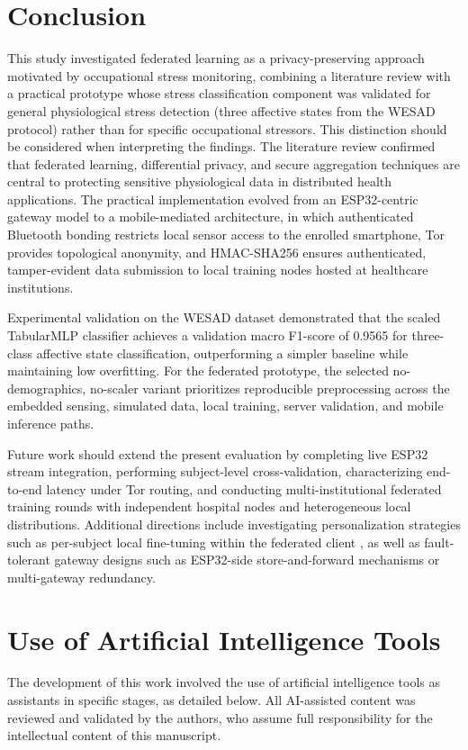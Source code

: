 \documentclass[12pt]{article}
\begin{document}
\section{Conclusion}

This study investigated federated learning as a privacy-preserving approach motivated by occupational stress monitoring, combining a literature review with a practical prototype whose stress classification component was validated for general physiological stress detection (three affective states from the WESAD protocol) rather than for specific occupational stressors. This distinction should be considered when interpreting the findings. The literature review confirmed that federated learning, differential privacy, and secure aggregation techniques are central to protecting sensitive physiological data in distributed health applications. The practical implementation evolved from an ESP32-centric gateway model to a mobile-mediated architecture, in which authenticated Bluetooth bonding restricts local sensor access to the enrolled smartphone, Tor provides topological anonymity, and HMAC-SHA256 ensures authenticated, tamper-evident data submission to local training nodes hosted at healthcare institutions.

Experimental validation on the WESAD dataset demonstrated that the scaled TabularMLP classifier achieves a validation macro F1-score of 0.9565 for three-class affective state classification, outperforming a simpler baseline while maintaining low overfitting. For the federated prototype, the selected no-demographics, no-scaler variant prioritizes reproducible preprocessing across the embedded sensing, simulated data, local training, server validation, and mobile inference paths.

Future work should extend the present evaluation by completing live ESP32 stream integration, performing subject-level cross-validation, characterizing end-to-end latency under Tor routing, and conducting multi-institutional federated training rounds with independent hospital nodes and heterogeneous local distributions. Additional directions include investigating personalization strategies such as per-subject local fine-tuning within the federated client \cite{ereno2025avaliando}, as well as fault-tolerant gateway designs such as ESP32-side store-and-forward mechanisms or multi-gateway redundancy.

\section*{Use of Artificial Intelligence Tools}
The development of this work involved the use of artificial intelligence tools as assistants in specific stages, as detailed below. All AI-assisted content was reviewed and validated by the authors, who assume full responsibility for the intellectual content of this manuscript.
\end{document}
